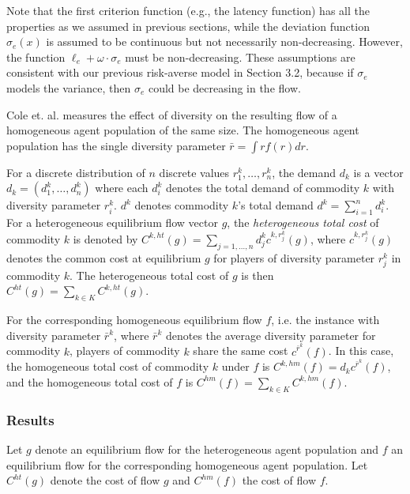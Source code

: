 Note that the first criterion function (e.g., the latency function) has all the properties as we assumed in previous sections, while the deviation function $\sigma_e(x)$ is assumed to be continuous but not necessarily non-decreasing. However, the function $\ell_e+\omega\cdot \sigma_e$ must be non-decreasing. These assumptions are consistent with our previous risk-averse model in Section 3.2, because if $\sigma_e$ models the variance, then $\sigma_e$ could be decreasing in the flow.

Cole et. al. measures the effect of diversity on the resulting flow of a homogeneous agent population of the same size. The homogeneous agent population has the single diversity parameter $\bar{r}=\int rf(r)d r$. 

For a discrete distribution of $n$ discrete values $r_1^k, \dots, r_n^k$, the demand $d_k$ is a vector $d_k=(d_1^k, \dots, d_n^k)$ where each $d_i^k$ denotes the total demand of commodity $k$ with diversity parameter $r_i^k$. $d^k$ denotes commodity $k$'s total demand $d^k=\sum_{i=1}^n d_i^k$. For a heterogeneous equilibrium flow vector $g$, the {\it heterogeneous total cost} of commodity $k$ is denoted by $C^{k,ht}(g)=\sum_{j=1,\dots, n} d_j^k c^{k, r_j^k}(g)$, where $c^{k, r_j^k}(g)$ denotes the common cost at equilibrium $g$ for players of diversity parameter $r_j^k$ in commodity $k$. The heterogeneous total cost of $g$ is then $C^{ht}(g)=\sum_{k\in K} C^{k,ht}(g)$. 

For the corresponding homogeneous equilibrium flow $f$, i.e. the instance with diversity parameter $\bar{r}^k$, where $\bar{r}^k$ denotes the average diversity parameter for commodity $k$, players of commodity $k$ share the same cost $c^{\bar{r}^k}(f)$. In this case, the homogeneous total cost of commodity $k$ under $f$ is $C^{k,hm}(f)=d_kc^{\bar{r}^k}(f)$, and the homogeneous total cost of $f$ is $C^{hm}(f)=\sum_{k\in K} C^{k,hm}(f)$. 


\subsubsection{Results}
Let $g$ denote an equilibrium flow for the heterogeneous agent population and $f$ an equilibrium flow for the corresponding homogeneous agent population. Let $C^{ht}(g)$ denote the cost of flow $g$ and $C^{hm}(f)$ the cost of flow $f$. 

